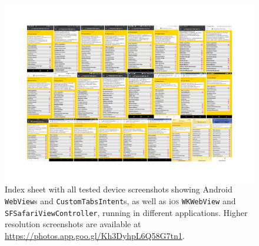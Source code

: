 \documentclass[sigconf]{acmart}
\begin{document}
\begin{figure}[b]
  \begin{center}
  \centerline{\includegraphics[width=\paperwidth, trim=0cm 2.5cm 0cm 0cm, clip]{index-sheet.pdf}}
  \caption{Index sheet with all tested device screenshots showing Android \texttt{WebView}s and
    \texttt{CustomTabsIntent}s, as well as i\textsc{os} \texttt{WKWebView} and \texttt{SFSafariViewController},
    running in different applications.
    Higher resolution screenshots are available at \url{https://photos.app.goo.gl/Kh3DyhpL6Q58G7tn1}.}
  \label{fig:indexsheet}
  \end{center}
\end{figure}



\end{document}
